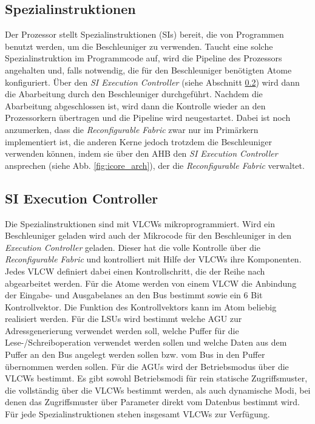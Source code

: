 \subsection{Spezialinstruktionen}
\label{sec:special_instruction}
Der Prozessor stellt Spezialinstruktionen (SIs) bereit, die von Programmen benutzt werden, um die Beschleuniger zu verwenden.
Taucht eine solche Spezialinstruktion im Programmcode auf, wird die Pipeline des Prozessors angehalten und, falls notwendig,
die für den Beschleuniger benötigten Atome konfiguriert. Über den \textit{SI Execution Controller} (siehe Abschnitt \ref{sec:si_exec_ctl})
wird dann die Abarbeitung durch den Beschleuniger durchgeführt. Nachdem die Abarbeitung abgeschlossen ist, wird dann die Kontrolle wieder an den Prozessorkern übertragen
und die Pipeline wird neugestartet. Dabei ist noch anzumerken, dass die \textit{Reconfigurable Fabric} zwar nur im Primärkern implementiert ist,
die anderen Kerne jedoch trotzdem die Beschleuniger verwenden können, indem sie über den AHB den \textit{SI Execution Controller} ansprechen (siehe Abb. \ref{fig:icore_arch}), der die \textit{Reconfigurable Fabric} verwaltet.

\subsection{SI Execution Controller}
\label{sec:si_exec_ctl}
Die Spezialinstruktionen sind mit VLCWs mikroprogrammiert. Wird ein Beschleuniger geladen wird auch der Mikrocode für den Beschleuniger in den \textit{Execution Controller} geladen.
Dieser hat die volle Kontrolle über die \textit{Reconfigurable Fabric} und kontrolliert mit Hilfe der VLCWs ihre Komponenten.
Jedes VLCW definiert dabei einen Kontrollschritt, die der Reihe nach abgearbeitet werden. Für die Atome werden von einem VLCW die Anbindung der Eingabe- und Ausgabelanes an den Bus bestimmt sowie ein 6 Bit Kontrollvektor.
Die Funktion des Kontrollvektors kann im Atom beliebig realisiert werden. Für die LSUs wird bestimmt welche AGU zur Adressgenerierung verwendet werden soll,
welche Puffer für die Lese-/Schreiboperation verwendet werden sollen und welche Daten aus dem Puffer an den Bus angelegt werden sollen bzw. vom Bus in den Puffer übernommen werden sollen.
Für die AGUs wird der Betriebsmodus über die VLCWs bestimmt. Es gibt sowohl Betriebsmodi für rein statische Zugriffsmuster, die vollständig über die VLCWs bestimmt werden, als auch dynamische Modi,
bei denen das Zugriffsmuster über Parameter direkt vom Datenbus bestimmt wird. Für jede Spezialinstruktionen stehen insgesamt  VLCWs zur Verfügung.

